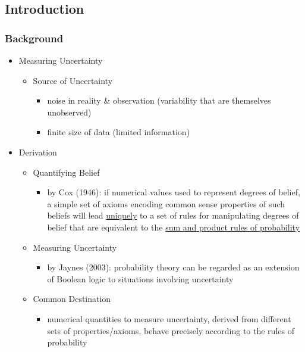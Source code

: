 \subsection{Introduction}
\subsubsection{Background}
\begin{itemize}
\item Measuring Uncertainty
	\begin{itemize}
	\item Source of Uncertainty
		\begin{itemize}
		\item noise in reality \& observation (variability that are themselves unobserved)
		\item finite size of data (limited information)
		\end{itemize}
	\end{itemize}
\item Derivation
	\begin{itemize}
	\item Quantifying Belief
		\begin{itemize}
		\item by Cox (1946): if numerical values used to
		represent degrees of belief, a simple set of axioms encoding common sense
		properties of such beliefs will lead \underline{uniquely} to a set of rules for manipulating degrees of
		belief that are equivalent to the \underline{sum and product rules of probability}
		\end{itemize}
	\item Measuring Uncertainty
		\begin{itemize}
		\item by Jaynes (2003): probability theory can be regarded as an extension of
		Boolean logic to situations involving uncertainty
		\end{itemize}
	\item Common Destination
		\begin{itemize}
		\item numerical quantities to measure uncertainty, derived from different sets of properties/axioms, behave precisely according to the rules of probability
		\end{itemize}
	\end{itemize}
\end{itemize}

